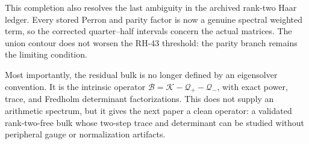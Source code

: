 \documentclass[11pt]{article}
\theoremstyle{definition}
\theoremstyle{remark}
\newcommand{\cK}{\mathcal K}
\newcommand{\cB}{\mathcal B}
\newcommand{\cQ}{\mathcal Q}
\begin{document}
This completion also resolves the last ambiguity in the archived rank-two
Haar ledger.  Every stored Perron and parity factor is now a genuine
spectral weighted term, so the corrected quarter--half intervals concern the
actual matrices.  The union contour does not worsen the RH-43 threshold:
the parity branch remains the limiting condition.

Most importantly, the residual bulk is no longer defined by an eigensolver
convention.  It is the intrinsic operator
$\cB=\cK-\cQ_+-\cQ_-$, with exact power, trace, and Fredholm determinant
factorizations.  This does not supply an arithmetic spectrum, but it gives
the next paper a clean operator: a validated rank-two-free bulk whose
two-step trace and determinant can be studied without peripheral gauge or
normalization artifacts.



\end{document}

